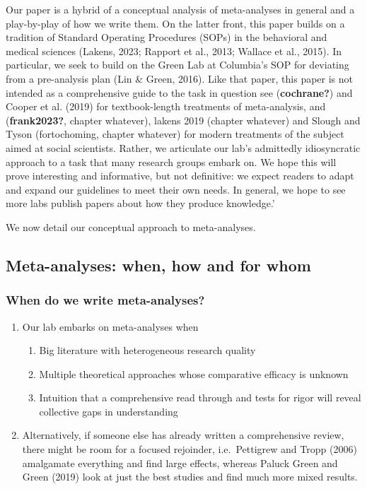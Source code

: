 \documentclass[
  man]{apa6}
\providecommand{\tightlist}{%
  \setlength{\itemsep}{0pt}\setlength{\parskip}{0pt}}
\begin{document}
Our paper is a hybrid of a conceptual analysis of meta-analyses in general and a play-by-play of how we write them. On the latter front, this paper builds on a tradition of Standard Operating Procedures (SOPs) in the behavioral and medical sciences (Lakens, 2023; Rapport et al., 2013; Wallace et al., 2015). In particular, we seek to build on the Green Lab at Columbia's SOP for deviating from a pre-analysis plan (Lin \& Green, 2016). Like that paper, this paper is not intended as a comprehensive guide to the task in question \textemdash see (\textbf{cochrane?}) and Cooper et al. (2019) for textbook-length treatments of meta-analysis, and (\textbf{frank2023?}, chapter whatever), lakens 2019 (chapter whatever) and Slough and Tyson (fortochoming, chapter whatever) for modern treatments of the subject aimed at social scientists. Rather, we articulate our lab's admittedly idiosyncratic approach to a task that many research groups embark on. We hope this will prove interesting and informative, but not definitive: we expect readers to adapt and expand our guidelines to meet their own needs. In general, we hope to see more labs publish papers about how they produce knowledge.'

We now detail our conceptual approach to meta-analyses.

\subsection{Meta-analyses: when, how and for whom}\label{meta-analyses-when-how-and-for-whom}

\subsubsection{When do we write meta-analyses?}\label{when-do-we-write-meta-analyses}

\begin{enumerate}
\def\labelenumi{\arabic{enumi}.}
\tightlist
\item
  Our lab embarks on meta-analyses when

  \begin{enumerate}
  \def\labelenumii{\arabic{enumii}.}
  \tightlist
  \item
    Big literature with heterogeneous research quality
  \item
    Multiple theoretical approaches whose comparative efficacy is unknown
  \item
    Intuition that a comprehensive read through and tests for rigor will reveal collective gaps in understanding
  \end{enumerate}
\item
  Alternatively, if someone else has already written a comprehensive review, there might be room for a focused rejoinder, i.e.~Pettigrew and Tropp (2006) amalgamate everything and find large effects, whereas Paluck Green and Green (2019) look at just the best studies and find much more mixed results.
\end{enumerate}
\end{document}

